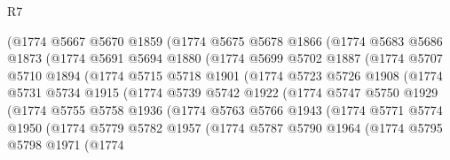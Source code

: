 \begin{lexlean}{R7}
\begin{coremodule}
              (@1774
                @5667
                @5670
                @1859
                (@1774
                  @5675
                  @5678
                  @1866
                  (@1774
                    @5683
                    @5686
                    @1873
                    (@1774
                      @5691
                      @5694
                      @1880
                      (@1774
                        @5699
                        @5702
                        @1887
                        (@1774
                          @5707
                          @5710
                          @1894
                          (@1774
                            @5715
                            @5718
                            @1901
                            (@1774
                              @5723
                              @5726
                              @1908
                              (@1774
                                @5731
                                @5734
                                @1915
                                (@1774
                                  @5739
                                  @5742
                                  @1922
                                  (@1774
                                    @5747
                                    @5750
                                    @1929
                                    (@1774
                                      @5755
                                      @5758
                                      @1936
                                      (@1774
                                        @5763
                                        @5766
                                        @1943
                                        (@1774
                                          @5771
                                          @5774
                                          @1950
                                          (@1774
                                            @5779
                                            @5782
                                            @1957
                                            (@1774
                                              @5787
                                              @5790
                                              @1964
                                              (@1774
                                                @5795
                                                @5798
                                                @1971
                                                (@1774

\end{coremodule}
\end{lexlean}
